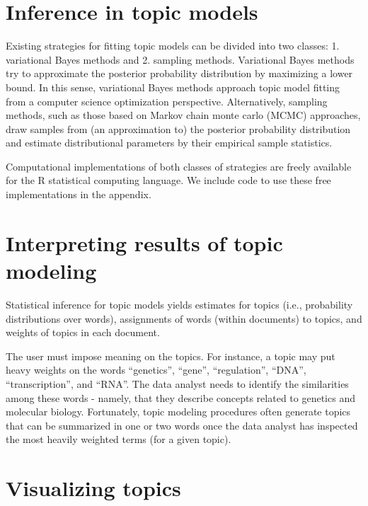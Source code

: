 \documentclass[12pt,]{article}
\begin{document}
\section{Inference in topic models}\label{inference-in-topic-models}

Existing strategies for fitting topic models can be divided into two
classes: 1. variational Bayes methods and 2. sampling methods.
Variational Bayes methods try to approximate the posterior probability
distribution by maximizing a lower bound. In this sense, variational
Bayes methods approach topic model fitting from a computer science
optimization perspective. Alternatively, sampling methods, such as those
based on Markov chain monte carlo (MCMC) approaches, draw samples from
(an approximation to) the posterior probability distribution and
estimate distributional parameters by their empirical sample statistics.

Computational implementations of both classes of strategies are freely
available for the R statistical computing language. We include code to
use these free implementations in the appendix.

\section{Interpreting results of topic
modeling}\label{interpreting-results-of-topic-modeling}

Statistical inference for topic models yields estimates for topics
(i.e., probability distributions over words), assignments of words
(within documents) to topics, and weights of topics in each document.

The user must impose meaning on the topics. For instance, a topic may
put heavy weights on the words ``genetics'', ``gene'', ``regulation'',
``DNA'', ``transcription'', and ``RNA''. The data analyst needs to
identify the similarities among these words - namely, that they describe
concepts related to genetics and molecular biology. Fortunately, topic
modeling procedures often generate topics that can be summarized in one
or two words once the data analyst has inspected the most heavily
weighted terms (for a given topic).

\section{Visualizing topics}\label{visualizing-topics}
\end{document}
